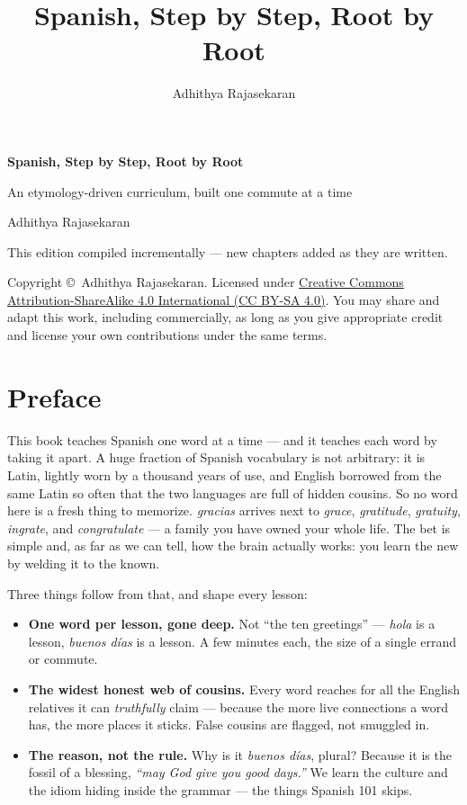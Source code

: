 \documentclass[11pt,twoside]{book}
\title{\Huge Spanish, Step by Step, Root by Root}
\author{Adhithya Rajasekaran}
\date{}
\begin{document}
\frontmatter

\begin{titlepage}
  \centering
  \vspace*{3cm}
  {\Huge\bfseries Spanish, Step by Step, Root by Root\par}
  \vspace{1cm}
  {\Large An etymology-driven curriculum, built one commute at a time\par}
  \vspace{1.5cm}
  {\large Adhithya Rajasekaran\par}
  \vfill
  {\large This edition compiled incrementally --- new chapters added as they
  are written.\par}
  \vspace{2cm}
  {\normalsize
    Copyright \copyright\ Adhithya Rajasekaran. Licensed under
    \href{https://creativecommons.org/licenses/by-sa/4.0/}%
    {Creative Commons Attribution-ShareAlike 4.0 International (CC BY-SA 4.0)}.
    You may share and adapt this work, including commercially, as long as
    you give appropriate credit and license your own contributions under
    the same terms.\par
  }
\end{titlepage}

\chapter*{Preface}

This book teaches Spanish one word at a time --- and it teaches each word by
taking it apart. A huge fraction of Spanish vocabulary is not arbitrary: it
is Latin, lightly worn by a thousand years of use, and English borrowed from
the same Latin so often that the two languages are full of hidden cousins.
So no word here is a fresh thing to memorize. \emph{gracias} arrives next to
\emph{grace}, \emph{gratitude}, \emph{gratuity}, \emph{ingrate}, and
\emph{congratulate} --- a family you have owned your whole life. The bet is
simple and, as far as we can tell, how the brain actually works: you learn
the new by welding it to the known.

Three things follow from that, and shape every lesson:

\begin{itemize}
  \item \textbf{One word per lesson, gone deep.} Not ``the ten greetings''
    --- \emph{hola} is a lesson, \emph{buenos d\'{i}as} is a lesson. A few
    minutes each, the size of a single errand or commute.
  \item \textbf{The widest honest web of cousins.} Every word reaches for
    all the English relatives it can \emph{truthfully} claim --- because the
    more live connections a word has, the more places it sticks. False
    cousins are flagged, not smuggled in.
  \item \textbf{The reason, not the rule.} Why is it \emph{buenos d\'{i}as},
    plural? Because it is the fossil of a blessing, \emph{``may God give you
    good days.''} We learn the culture and the idiom hiding inside the
    grammar --- the things Spanish 101 skips.
\end{itemize}
\end{document}
